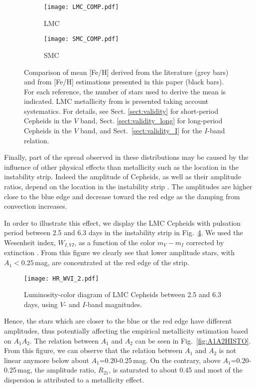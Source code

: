 \documentclass[article]{aa} %
\begin{document}
\begin{figure}
\begin{subfigure}{0.50\textwidth}
\texttt{[image: LMC\_COMP.pdf]}
\caption{LMC} \label{fig:comp_lmc}
\end{subfigure}%

\begin{subfigure}{0.50\textwidth}
\texttt{[image: SMC\_COMP.pdf]}
\caption{SMC} \label{fig:comp_smc}
\end{subfigure}
\caption{\small Comparison of mean [Fe/H] derived from the literature (grey bars) and from [Fe/H] estimations presented in this paper (black bars). For each reference, the number of stars used to derive the mean is indicated. LMC metallicity from \cite{Romaniello2022} is presented taking account systematics. For details, see Sect. \ref{sect:validity} for short-period Cepheids in the $V$ band, Sect. \ref{sect:validity_long} for long-period Cepheids in the $V$ band, and Sect.~\ref{sect:validity_I} for the $I$-band relation. \label{fig:comp}}
\end{figure}



Finally, part of the spread observed in these distributions may be caused by the influence of other physical effects than metallicity such as the location in the instability strip. Indeed the amplitude of Cepheids, as well as their amplitude ratios, depend on the location in the instability strip \citep{Sandage1971,Sandage2004}. The amplitudes are higher close to the blue edge and decrease toward the red edge as the damping from convection increases.

In order to illustrate this effect, we display the LMC Cepheids with pulsation period between 2.5 and 6.3 days in the instability strip in Fig.~\ref{fig:HR}. We used the Wesenheit index, $W_{I,VI}$, as a function of the color $m_V-m_I$ corrected by extinction \citep{Skowron2021}. From this figure we clearly see that lower amplitude stars, with $A_1<0.25\,$mag, are concentrated at the red edge of the strip.
\begin{figure}
\begin{center}
\texttt{[image: HR\_WVI\_2.pdf]}
\caption{\small Luminosity-color diagram of LMC Cepheids between 2.5 and 6.3 days, using $V$- and $I$-band magnitudes.  \label{fig:HR}} 
\end{center}
\end{figure}
Hence, the stars which are closer to the blue or the red edge have different amplitudes, thus potentially affecting the empirical metallicity estimation based on $A_1A_2$. The relation between $A_1$ and $A_{2}$ can be seen in Fig.~\ref{fig:A1A2HISTO}. From this figure, we can observe that the relation between $A_1$ and $A_2$ is not linear anymore below about $A_{1}$=0.20-0.25$\,$mag. On the contrary, above $A_1$=0.20-0.25$\,$mag, the amplitude ratio, $R_{21}$, is saturated to about 0.45 and most of the dispersion is attributed to a metallicity effect.
\end{document}
